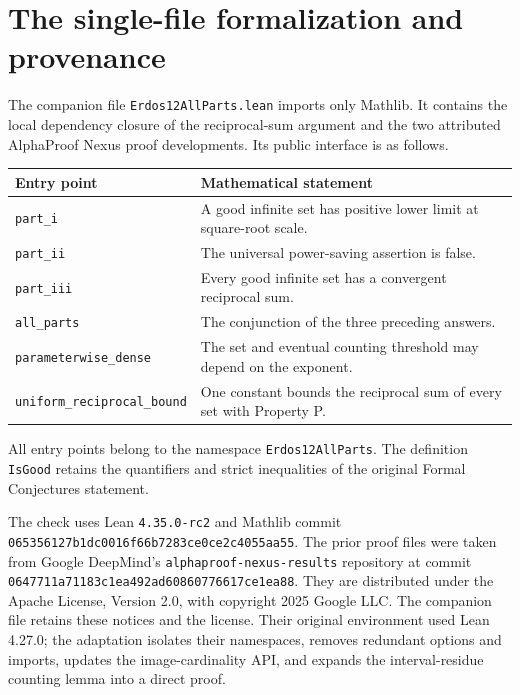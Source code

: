 \section{The single-file formalization and provenance}\label{sec:formalization}

The companion file \texttt{Erdos12AllParts.lean} imports only Mathlib.
It contains the local dependency closure of the reciprocal-sum argument
and the two attributed AlphaProof Nexus proof developments. Its public
interface is as follows.

\begin{center}
\begin{tabular}{p{}p{}}
\hline
Entry point & Mathematical statement\\
\hline
\texttt{part\_i} & A good infinite set has positive lower limit at square-root scale.\\[3pt]
\texttt{part\_ii} & The universal power-saving assertion is false.\\[3pt]
\texttt{part\_iii} & Every good infinite set has a convergent reciprocal sum.\\[3pt]
\texttt{all\_parts} & The conjunction of the three preceding answers.\\[3pt]
\texttt{parameterwise\_}\newline\texttt{dense} & The set and eventual counting threshold may depend on the exponent.\\[3pt]
\texttt{uniform\_}\newline\texttt{reciprocal\_bound} & One constant bounds the reciprocal sum of every set with Property P.\\
\hline
\end{tabular}
\end{center}
All entry points belong to the namespace \texttt{Erdos12AllParts}.
The definition \texttt{IsGood} retains the quantifiers and strict
inequalities of the original Formal Conjectures statement.

The check uses Lean \texttt{4.35.0-rc2} and Mathlib commit
\nolinkurl{065356127b1dc0016f66b7283ce0ce2c4055aa55}.
The prior proof files were taken from Google DeepMind's
\texttt{alphaproof-nexus-results} repository at commit
\nolinkurl{0647711a71183c1ea492ad60860776617ce1ea88}.
They are distributed under the Apache License, Version 2.0, with
copyright 2025 Google LLC. The companion file retains these notices and
the license. Their original environment used Lean 4.27.0;
the adaptation isolates their namespaces, removes redundant options and
imports, updates the image-cardinality API, and expands the
interval-residue counting lemma into a direct proof.

